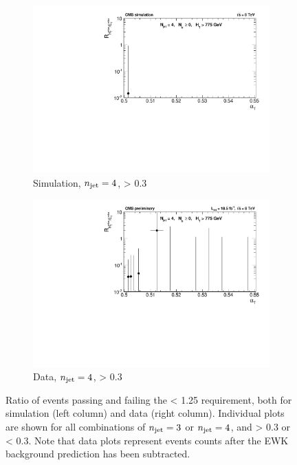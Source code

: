 \begin{figure}[p!]
    \begin{subfigure}[b]{0.46\textwidth}
      \includegraphics[width=\textwidth]{Figs/dphi/chris2/qcd_mc/dphi_gt0p3/v2/ratio_eq4j_ge0b_775}
      \caption{Simulation, $n_{\text{jet}} = 4$, \mindphistar > 0.3}
      \label{fig:rdphi_sim_j4_gt0p3}
    \end{subfigure}
    \begin{subfigure}[b]{0.46\textwidth}
      \includegraphics[width=\textwidth]{Figs/dphi/chris2/data/dphi_gt0p3/v2/ratio_eq4j_ge0b_775}
      \caption{Data, $n_{\text{jet}} = 4$, \mindphistar > 0.3}
      \label{fig:rdphi_data_j4_gt0p3}
    \end{subfigure}
    \caption{Ratio of events passing and failing the \mhtmet < 1.25
    requirement, both for simulation (left column) and data (right column).
    Individual plots are shown for all combinations of $n_{\text{jet}} = 3$ or $n_{\text{jet}} = 4$,
    and \mindphistar > 0.3 or \mindphistar < 0.3. Note that data plots
    represent events counts after the EWK background prediction has been
    subtracted.}
    \label{fig:rmhtmet_dphi_data_sim}
  \end{figure}

